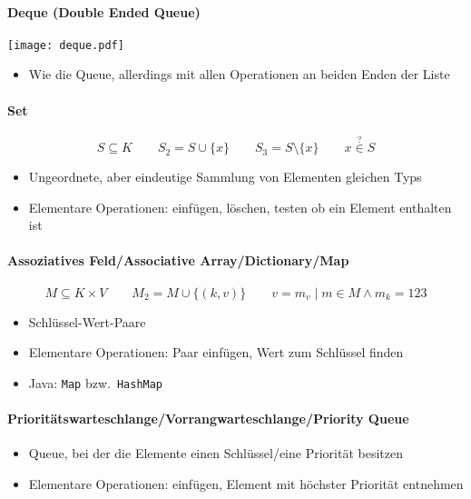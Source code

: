 \paragraph{Deque (Double Ended Queue)}
\noindent\begin{center}
    \texttt{[image: deque.pdf]}
\end{center}
\begin{itemize}
  \item Wie die Queue, allerdings mit allen Operationen an beiden Enden der Liste
\end{itemize}

\paragraph{Set}
\[
  S \subseteq K
  \qquad
  S_2 = S \cup \lbrace x \rbrace
  \qquad
  S_3 = S \setminus \lbrace x \rbrace
  \qquad
  x \stackrel{?}{\in} S
\]
\begin{itemize}
  \item Ungeordnete, aber eindeutige Sammlung von Elementen gleichen Typs
  \item Elementare Operationen: einfügen, löschen, testen ob ein Element enthalten ist
\end{itemize}

\paragraph{Assoziatives Feld/Associative Array/Dictionary/Map}
\[
  M \subseteq K \times V
  \qquad
  M_2 = M \cup \lbrace (k,v) \rbrace
  \qquad
  v = m_v \mid m \in M \land m_k = 123
\]
\begin{itemize}
  \item Schlüssel-Wert-Paare
  \item Elementare Operationen: Paar einfügen, Wert zum Schlüssel finden
  \item Java: \texttt{Map} bzw.~\texttt{HashMap}
\end{itemize}

\paragraph{Prioritätswarteschlange/Vorrangwarteschlange/Priority Queue}
\begin{itemize}
  \item Queue, bei der die Elemente einen Schlüssel/eine Priorität besitzen
  \item Elementare Operationen: einfügen, Element mit höchster Priorität entnehmen
\end{itemize}



